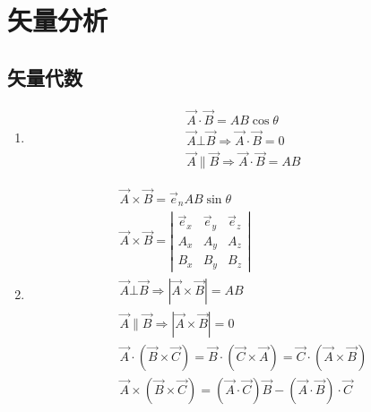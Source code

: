 \chapter{矢量分析}

\section {矢量代数}
\begin{enumerate}
	\item 
		\begin{eqnarray}
		&\vec{A} \cdot \vec{B} = AB\cos\theta& \\
		&\vec{A}\bot\vec{B}\Rightarrow\vec{A}\cdot\vec{B}=0& \\
		&\vec{A}\parallel\vec{B}\Rightarrow\vec{A}\cdot\vec{B}=AB&
		\end{eqnarray}
	\item 
		\begin{eqnarray}
		&\vec A \times \vec B = {\vec e_n}AB\sin \theta& \\
		&\vec A \times \vec B = \left|\begin{array}{ccc}
									    \vec e_x & \vec e_y & \vec e_z  \\ 
										A_x & A_y & A_z  \\
										B_x & B_y & B_z
									\end{array} \right|& \\
		&\vec{A}\bot\vec{B} \Rightarrow \left| \vec{A} \times \vec{B} \right|= AB& \\
		&\vec{A}\parallel\vec{B} \Rightarrow \left| \vec{A} \times \vec{B} \right|= 0& \\
		&\vec{A}\cdot (\vec{B}\times \vec{C})=\vec{B}\cdot (\vec{C}\times \vec{A})=\vec{C}\cdot (\vec{A}\times \vec{B})& \\
		&\vec{A}\times (\vec{B}\times \vec{C})=(\vec{A}\cdot \vec{C})\vec{B}-(\vec{A}\cdot \vec{B})\cdot \vec{C}&
		\end{eqnarray}
		
\end{enumerate}

